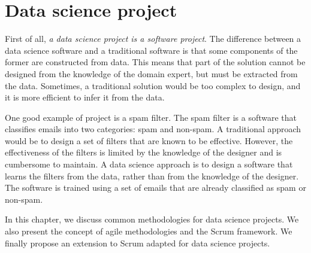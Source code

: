 \chapter{Data science project}
\label{chap:project}



First of all, \emph{a data science project is a software project}.  The difference between a data
science software and a traditional software is that some components of the former are
constructed from data.  This means that part of the solution cannot be designed from the
knowledge of the domain expert, but must be extracted from the data.  Sometimes, a
traditional solution would be too complex to design, and it is more efficient to infer it
from the data.

One good example of project is a spam filter.  The spam filter is a software that
classifies emails into two categories: spam and non-spam.  A traditional approach would be
to design a set of filters that are known to be effective.  However, the effectiveness of
the filters is limited by the knowledge of the designer and is cumbersome to maintain.  A
data science approach is to design a software that learns the filters from the data,
rather than from the knowledge of the designer.  The software is trained using a set of
emails that are already classified as spam or non-spam.

In this chapter, we discuss common methodologies for data science projects.  We also
present the concept of agile methodologies and the Scrum framework.  We finally propose an
extension to Scrum adapted for data science projects.


